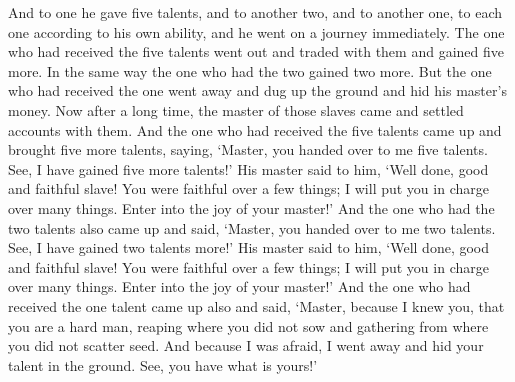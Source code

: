 \begin{biblechapter}
\verse And to one he gave five talents, and to another two, and to another one, to each one according to his own ability, and he went on a journey immediately.
\verse The one who had received the five talents went out and traded with them and gained five more.
\verse In the same way the one who had the two gained two more.
\verse But the one who had received the one went away and dug up the ground and hid his master’s money.
\verse Now after a long time, the master of those slaves came and settled accounts with them.
\verse And the one who had received the five talents came up and brought five more talents, saying, ‘Master, you handed over to me five talents. See, I have gained five more talents!’
\verse His master said to him, ‘Well done, good and faithful slave! You were faithful over a few things; I will put you in charge over many things. Enter into the joy of your master!’
\verse And the one who had the two talents also came up and said, ‘Master, you handed over to me two talents. See, I have gained two talents more!’
\verse His master said to him, ‘Well done, good and faithful slave! You were faithful over a few things; I will put you in charge over many things. Enter into the joy of your master!’
\verse And the one who had received the one talent came up also and said, ‘Master, because I knew you, that you are a hard man, reaping where you did not sow and gathering from where you did not scatter seed.
\verse And because I was afraid, I went away and hid your talent in the ground. See, you have what is yours!’

\end{biblechapter}
